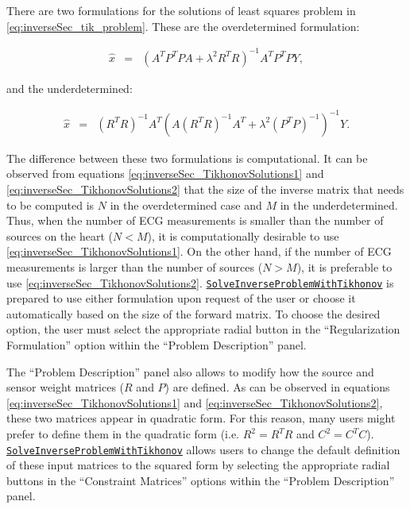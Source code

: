     There are two formulations for the solutions of least squares problem in \autoref{eq:inverseSec_tik_problem}.
    These are the overdetermined formulation:
    \begin{center}
    \begin{eqnarray}
        \hat{x}   &=& \left(A^T P^TPA + \lambda^{2}R^TR\right)^{-1} A^T P^TP Y,
    \label{eq:inverseSec_TikhonovSolutions1}
    \end{eqnarray}
    \end{center}
    and the underdetermined:
    \begin{center}
    \begin{eqnarray}
        \hat{x}  &=& (R^TR)^{-1} A^T \left( A(R^TR)^{-1}A^T + \lambda^2 (P^TP)^{-1}  \right)^{-1}Y.
    \label{eq:inverseSec_TikhonovSolutions2}
    \end{eqnarray}
    \end{center}
    The difference between these two formulations is computational.
    It can be observed from equations \ref{eq:inverseSec_TikhonovSolutions1} and \ref{eq:inverseSec_TikhonovSolutions2} that the size of the inverse matrix that needs to be computed is $N$ in the overdetermined case and $M$ in the underdetermined.
    Thus, when the number of ECG measurements is smaller than the number of sources on the heart ($N<M$), it is computationally desirable to use \autoref{eq:inverseSec_TikhonovSolutions1}.
    On the other hand, if the number of ECG measurements is larger than the number of sources ($N>M$), it is preferable to use \autoref{eq:inverseSec_TikhonovSolutions2}.
    \href{http://scirundocwiki.sci.utah.edu/SCIRunDocs/index.php/CIBC:Documentation:SCIRun:Reference:BioPSE:SolveInverseProblemWithTikhonov}{{\tt SolveInverseProblemWithTikhonov}} is prepared to use either formulation upon request of the user or choose it automatically based on the size of the forward matrix.
    To choose the desired option, the user must select the appropriate radial button in the ``Regularization Formulation'' option within the  ``Problem Description'' panel.

    The ``Problem Description'' panel also allows to modify how the source and sensor weight matrices ($R$ and $P$) are defined.
    As can be observed in equations \ref{eq:inverseSec_TikhonovSolutions1} and \ref{eq:inverseSec_TikhonovSolutions2}, these two matrices appear in quadratic form. For this reason, many users might prefer to define them in the quadratic form (i.e. $R^2=R^TR$ and $C^2=C^TC$).
    \href{http://scirundocwiki.sci.utah.edu/SCIRunDocs/index.php/CIBC:Documentation:SCIRun:Reference:BioPSE:SolveInverseProblemWithTikhonov}{{\tt SolveInverseProblemWithTikhonov}} allows users to change the default definition of these input matrices to the squared form by selecting the appropriate radial buttons in the ``Constraint Matrices'' options within the  ``Problem Description'' panel.


